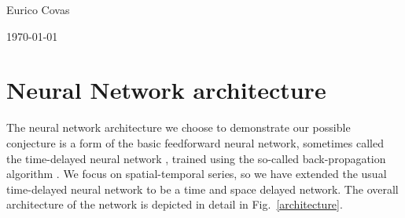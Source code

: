 \documentclass[journal]{IEEEtran}
\begin{document}
\hfill Eurico Covas

\hfill \today

\section{Neural Network architecture}

The neural network architecture we choose to demonstrate our possible conjecture is a form of the basic feedforward neural network,
sometimes called the time-delayed neural network \cite{Waibel:1990:PRU:108235.108263}, trained using the so-called back-propagation
algorithm \cite{10.1007/BFb0006203, 1986Natur.323..533R, 58337}. We focus on spatial-temporal series, so we have extended the usual time-delayed neural network
to be a time and space delayed network. The overall architecture of the network is depicted in detail in Fig.\ \ref{architecture}.
\end{document}
